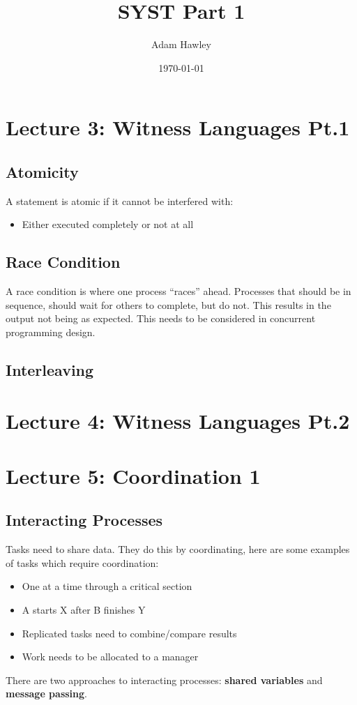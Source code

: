 \documentclass{article}
\author{Adam Hawley}
\date{\today}
\title{SYST Part 1}
\begin{document}
\tableofcontents

\maketitle
\section{Lecture 3: Witness Languages Pt.1}
\subsection{Atomicity}
A statement is atomic if it cannot be interfered with:
\begin{itemize}
	\item Either executed completely or not at all
\end{itemize}

\subsection{Race Condition}
A race condition is where one process ``races'' ahead.
Processes that should be in sequence, should wait for others to complete, but do not.
This results in the output not being as expected.
This needs to be considered in concurrent programming design.

\subsection{Interleaving}


\maketitle
\section{Lecture 4: Witness Languages Pt.2}



\maketitle
\section{Lecture 5: Coordination 1}
\subsection{Interacting Processes}
Tasks need to share data.
They do this by coordinating, here are some examples of tasks which require coordination:
\begin{itemize}
	\item One at a time through a critical section
	\item A starts X after B finishes Y
	\item Replicated tasks need to combine/compare results
	\item Work needs to be allocated to a manager
\end{itemize}
There are two approaches to interacting processes: \textbf{shared variables} and \textbf{message passing}.
\end{document}
